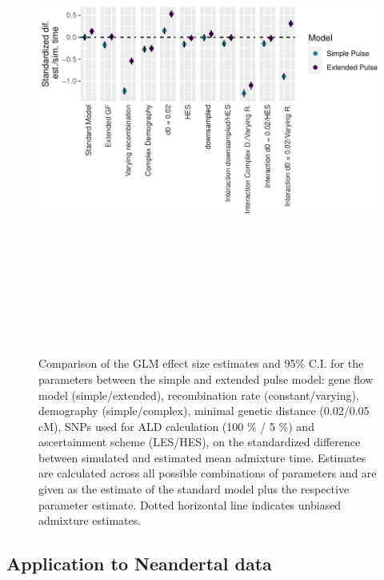 \documentclass[11pt]{article}
\begin{document}
\begin{figure}
\centering
\includegraphics[width=12cm,height=16cm,keepaspectratio]{ATE_Revisions_files/figure-latex/figResult_3_GLM_SP_and_EP_model_3-1.pdf}
\caption{\label{fig:figGLM} Comparison of the GLM effect size estimates and 95\% C.I. for the parameters between the simple and extended pulse model: gene flow model (simple/extended), recombination rate (constant/varying), demography (simple/complex), minimal genetic distance (0.02/0.05 cM), SNPs used for ALD calculation (100 \% / 5 \%) and ascertainment scheme (LES/HES), on the standardized difference between simulated and estimated mean admixture time. Estimates are calculated across all possible combinations of parameters and are given as the estimate of the standard model plus the respective parameter estimate. Dotted horizontal line indicates unbiased admixture estimates.}
\end{figure}

\subsection{Application to Neandertal data}
\end{document}
